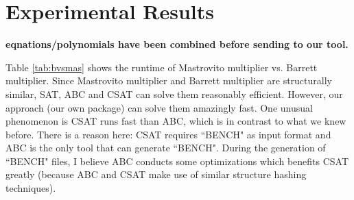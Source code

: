 \section{Experimental Results}

{\bf eqnations/polynomials have been combined before sending to our tool.}

Table \ref{tab:bvsmas} shows the runtime of Mastrovito multiplier vs. Barrett multiplier. 
Since Mastrovito multiplier and Barrett multiplier are structurally similar, SAT, ABC and CSAT can solve them reasonably efficient.
However, our approach (our own package) can solve them amazingly fast. 
One unusual phenomenon is CSAT runs fast than ABC, which is in contrast to what we knew before. 
There is a reason here: CSAT requires ``BENCH" as input format and ABC is the only tool that can generate ``BENCH". During the generation of ``BENCH" files, 
I believe ABC conducts some optimizations which benefits CSAT greatly (because ABC and CSAT make use of similar structure hashing techniques). 

